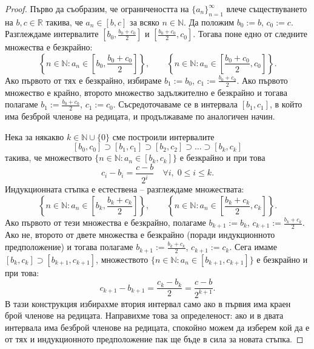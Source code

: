 \begin{proof}
Първо да съобразим, че ограничеността на $\{a_n\}_{n=1}^{\infty}$ влече съществуването на $b, c \in \mathbb{R}$ такива, че $a_n \in [b, c]$ за всяко $n \in \mathbb{N}$. Да положим $b_0 := b$, $c_0 := c$. Разглеждаме интервалите $\left[b_0, \frac{b_0 + c_0}{2}\right]$ и $\left[\frac{b_0 + c_0}{2}, c_0\right]$. Тогава поне едно от следните множества е безкрайно:
\[
\left\{n \in \mathbb{N} : a_n \in \left[b_0, \frac{b_0 + c_0}{2}\right]\right\}, \qquad \left\{n \in \mathbb{N} : a_n \in \left[\frac{b_0 + c_0}{2}, c_0\right]\right\}.
\]
Ако първото от тях е безкрайно, избираме $b_1 := b_0$, $c_1 := \frac{b_0 + c_0}{2}$. Ако първото множество е крайно, второто множество задължително е безкрайно и тогава полагаме $b_1 := \frac{b_0 + c_0}{2}$, $c_1 := c_0$. Съсредоточаваме се в интервала $[b_1, c_1]$, в който има безброй членове на редицата, и продължаваме по аналогичен начин.

Нека за някакво $k \in \mathbb{N} \cup \{0\}$ сме построили интервалите
\[
[b_0, c_0] \supset [b_1, c_1] \supset [b_2, c_2] \supset \dots \supset [b_k, c_k]
\]
такива, че множеството $\{n \in \mathbb{N} : a_n \in [b_k, c_k]\}$ е безкрайно и при това
\[
c_i - b_i = \frac{c - b}{2^i} \quad \forall i, \; 0 \le i \le k.
\]
Индукционната стъпка е естествена -- разглеждаме множествата:
\[
\left\{n \in \mathbb{N} : a_n \in \left[b_k, \frac{b_k + c_k}{2}\right]\right\}, \qquad \left\{n \in \mathbb{N} : a_n \in \left[\frac{b_k + c_k}{2}, c_k\right]\right\}.
\]
Ако първото от тези множества е безкрайно, полагаме $b_{k+1} := b_k$, $c_{k+1} := \frac{b_k + c_k}{2}$. Ако не, второто от двете множества е безкрайно (поради индукционното предположение) и тогава полагаме $b_{k+1} := \frac{b_k + c_k}{2}$, $c_{k+1} := c_k$. Сега имаме $[b_k, c_k] \supset [b_{k+1}, c_{k+1}]$, множеството $\{n \in \mathbb{N} : a_n \in [b_{k+1}, c_{k+1}]\}$ е безкрайно и при това:
\[
c_{k+1} - b_{k+1} = \frac{c_k - b_k}{2} = \frac{c - b}{2^{k+1}}.
\]
В тази конструкция избирахме втория интервал само ако в първия има краен брой членове на редицата. Направихме това за определеност: ако и в двата интервала има безброй членове на редицата, спокойно можем да изберем кой да е от тях и индукционното предположение пак ще бъде в сила за новата стъпка.


\end{proof}
